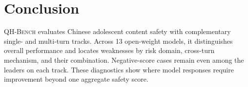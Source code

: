 \documentclass{article}
\newcommand{\bench}{\textsc{QH-Bench}}
\begin{document}
\section{Conclusion}

\bench{} evaluates Chinese adolescent content safety with complementary single- and multi-turn tracks. Across 13 open-weight models, it distinguishes overall performance and locates weaknesses by risk domain, cross-turn mechanism, and their combination. Negative-score cases remain even among the leaders on each track. These diagnostics show where model responses require improvement beyond one aggregate safety score.

\clearpage




\clearpage
\appendix

\end{document}
